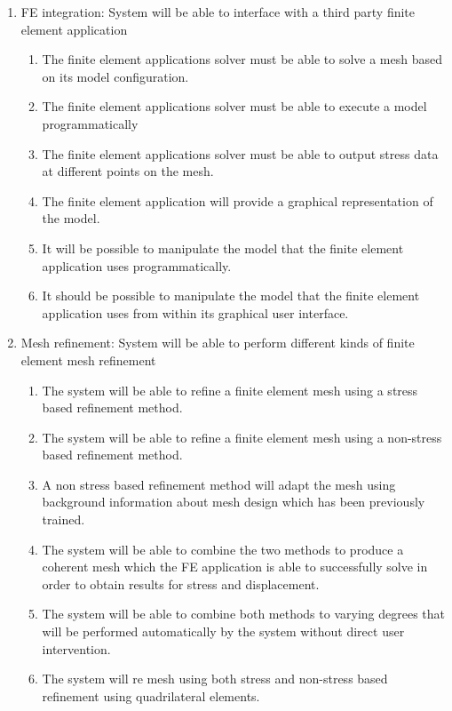 \begin{enumerate}
\item FE integration: System will be able to interface with a third party finite element application

\begin{enumerate}
\item The finite element applications solver must be able to solve a mesh based on its model configuration.
\item The finite element applications solver must be able to execute a model programmatically
\item The finite element applications solver must be able to output stress data at different points on the mesh.
\item The finite element application will provide a graphical representation of the model.
\item It will be possible to manipulate the model that the finite element application uses programmatically.
\item It should be possible to manipulate the model that the finite element application uses from within its graphical user interface.
\end{enumerate}

\item Mesh refinement: System will be able to perform different kinds of finite element mesh refinement

\begin{enumerate}
\item The system will be able to refine a finite element mesh using a stress based refinement method.

\item The system will be able to refine a finite element mesh using a non-stress based refinement method.

\item A non stress based refinement method will adapt the mesh using background information about mesh design which has been previously trained.

\item The system will be able to combine the two methods to produce a coherent mesh which the FE application is able to successfully solve in order to obtain results for stress and displacement.

\item The system will be able to combine both methods to varying degrees that will be performed automatically by the system without direct user intervention.
\item The system will re mesh using both stress and non-stress based refinement using quadrilateral elements.


\end{enumerate}
\end{enumerate}
